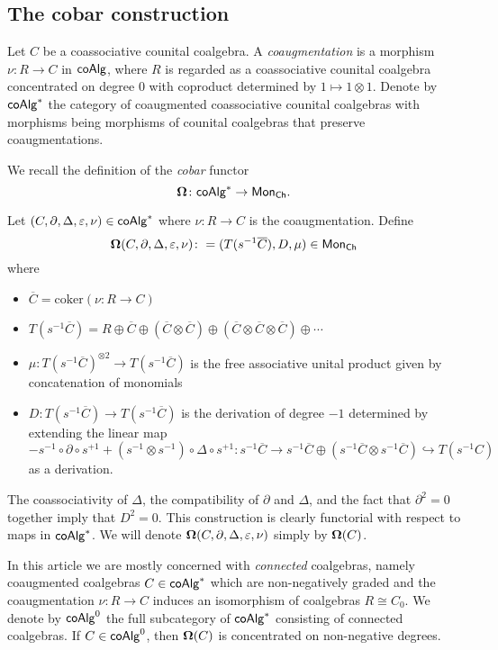

\subsection{The cobar construction}

Let $C$ be a coassociative counital coalgebra. A \textit{coaugmentation} is a morphism $\nu \colon R \to C$ in $\mathsf{coAlg}$, where $R$ is regarded as a coassociative counital coalgebra concentrated on degree $0$ with coproduct determined by $1 \mapsto 1 \otimes 1$. Denote by $\mathsf{coAlg}^*$ the category of coaugmented coassociative counital coalgebras with morphisms being morphisms of counital coalgebras that preserve coaugmentations. 

We recall the definition of the \textit{cobar} functor 
$$ \mathbf{\Omega} \colon \mathsf{coAlg}^* \to \mathsf{Mon}_{\mathsf{Ch}}.$$

Let  $(C, \partial, \Delta, \varepsilon, \nu)  \in \mathsf{coAlg}^*$ where $\nu \colon R \to C$ is the coaugmentation. Define
$$ \mathbf{\Omega}(C, \partial, \Delta, \varepsilon, \nu)  \colon= ( T(s^{-1}  \overline{C} ), D, \mu) \in \mathsf{Mon}_{\mathsf{Ch}}$$ where 
\begin{itemize}
\item $\overline{C}=\text{coker}(\nu \colon R \to C)$
\item $T(s^{-1} \overline{C})= R \oplus \overline{C} \oplus (\overline{C}  \otimes \overline{C} ) \oplus ( \overline{C} \otimes \overline{C} \otimes \overline{C} ) \oplus\cdots $
\item $\mu \colon T(s^{-1}  \overline{C} )^{\otimes 2} \to T(s^{-1}  \overline{C} ) $ is the free associative unital product given by concatenation of monomials
\item $D \colon T(s^{-1}  \overline{C} ) \to T(s^{-1}  \overline{C} )$ is the derivation of degree $-1$ determined by extending the linear map $$- s^{-1} \circ \partial \circ s^{+1} + (s^{-1} \otimes s^{-1}) \circ \Delta \circ s^{+1} \colon s^{-1}\overline{C} \to s^{-1}\overline{C} \oplus (s^{-1}\overline{C} \otimes s^{-1}\overline{C}) \hookrightarrow T(s^{-1}C)$$ as a derivation.
\end{itemize}

The coassociativity of $\Delta$, the compatibility of $\partial$ and $\Delta$, and the fact that $\partial^2 =0$ together imply that $D^2=0$. This construction is clearly functorial with respect to maps in $\mathsf{coAlg}^*$. We will denote $ \mathbf{\Omega} (C, \partial, \Delta, \varepsilon, \nu)$ simply by $ \mathbf{\Omega}(C)$. 

In this article we are mostly concerned with \textit{connected} coalgebras, namely coaugmented coalgebras $C \in \mathsf{coAlg}^*$ which are non-negatively graded and the coaugmentation $\nu \colon R \to C$ induces an isomorphism of coalgebras $R \cong C_0$. We denote by $\mathsf{coAlg}^0$ the full subcategory of $\mathsf{coAlg}^*$ consisting of connected coalgebras. If $C \in \mathsf{coAlg}^0$, then $ \mathbf{\Omega}(C)$ is concentrated on non-negative degrees. 

